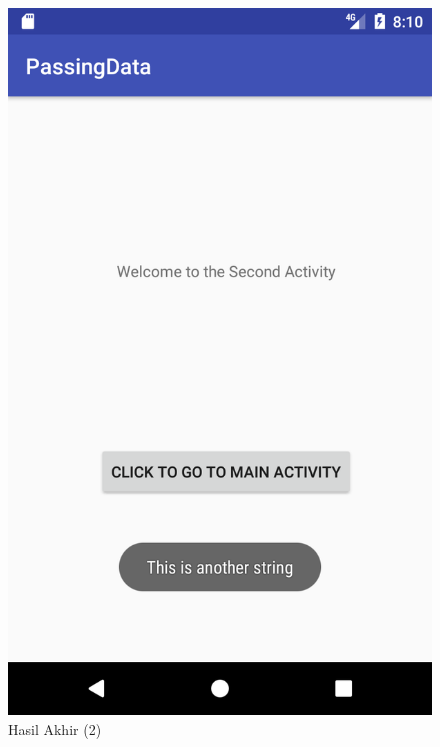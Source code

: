 \documentclass{scrartcl}
\begin{document}
\begin{enumerate}
\begin{figure}[htbp]
\begin{minipage}{.5\textwidth}
			\includegraphics[width=0.7\linewidth]{Screenshot_1496841047}
			\caption{Hasil Akhir (2)}
			\label{fig:screenshot_1496841047}
		\end{minipage}
	\end{figure}


\end{enumerate}
\end{document}
